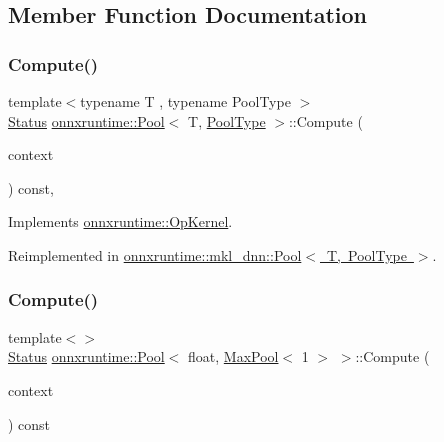 \subsection{Member Function Documentation}
\mbox{\label{classonnxruntime_1_1Pool_afc168d47c3d4a0a67c40bd3e14bd1431}} 
\subsubsection{\texorpdfstring{Compute()}{Compute()}\hspace{0.1cm}{\footnotesize\ttfamily [1/4]}}
{\footnotesize\ttfamily template$<$typename T , typename Pool\+Type $>$ \\
\mbox{\hyperlink{classonnxruntime_1_1common_1_1Status}{Status}} \mbox{\hyperlink{classonnxruntime_1_1Pool}{onnxruntime\+::\+Pool}}$<$ T, \mbox{\hyperlink{namespaceonnxruntime_aa4ff52f19ea8c4d3e4ce3ffbabbc7060}{Pool\+Type}} $>$\+::Compute (\begin{DoxyParamCaption}\item[{\mbox{\hyperlink{classonnxruntime_1_1OpKernelContext}{Op\+Kernel\+Context}} $\ast$}]{context }\end{DoxyParamCaption}) const\hspace{0.3cm}{\ttfamily [override]}, {\ttfamily [virtual]}}



Implements \mbox{\hyperlink{classonnxruntime_1_1OpKernel_a9eca8656a78b1b3ab9d3351a12798650}{onnxruntime\+::\+Op\+Kernel}}.



Reimplemented in \mbox{\hyperlink{classonnxruntime_1_1mkl__dnn_1_1Pool_aff8a05a3aec92d9e68b366ead56de08f}{onnxruntime\+::mkl\+\_\+dnn\+::\+Pool$<$ T, Pool\+Type $>$}}.

\mbox{\label{classonnxruntime_1_1Pool_a22de9b978800e6bf5b9bc94e8beef55f}} 
\subsubsection{\texorpdfstring{Compute()}{Compute()}\hspace{0.1cm}{\footnotesize\ttfamily [2/4]}}
{\footnotesize\ttfamily template$<$$>$ \\
\mbox{\hyperlink{classonnxruntime_1_1common_1_1Status}{Status}} \mbox{\hyperlink{classonnxruntime_1_1Pool}{onnxruntime\+::\+Pool}}$<$ float, \mbox{\hyperlink{classonnxruntime_1_1MaxPool}{Max\+Pool}}$<$ 1 $>$ $>$\+::Compute (\begin{DoxyParamCaption}\item[{\mbox{\hyperlink{classonnxruntime_1_1OpKernelContext}{Op\+Kernel\+Context}} $\ast$}]{context }\end{DoxyParamCaption}) const\hspace{0.3cm}{\ttfamily [virtual]}}



